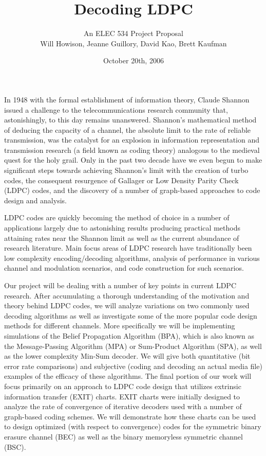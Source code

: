 \documentclass[11pt]{article}
\begin{document}
\title{Decoding LDPC}
\author{An ELEC 534 Project Proposal\\Will Howison, Jeanne Guillory, David Kao, Brett Kaufman }
\date{October 20th, 2006}
\maketitle	%

\thispagestyle{empty}
In 1948 with the formal establishment of information theory, Claude Shannon issued a challenge to the telecommunications research community that, astonishingly, to this day remains unanswered. Shannon's mathematical method of deducing the capacity of a channel, the absolute limit to the rate of reliable transmission, was the catalyst for an explosion in information representation and transmission research (a field known as coding theory) analogous to the medieval quest for the holy grail. Only in the past two decade have we even begun to make significant steps towards achieving Shannon's limit with the creation of turbo codes\cite{BerGlaThi1993}, the consequent resurgence of Gallager or Low Density Parity Check (LDPC) codes\cite{Mackay1999}, and the discovery of a number of graph-based approaches to code design and analysis.

LDPC codes are quickly becoming the method of choice in a number of applications largely due to astonishing results producing practical methods attaining rates near the Shannon limit as well as the current abundance of research literature. Main focus areas of LDPC research have traditionally been low complexity encoding/decoding algorithms, analysis of performance in various channel and modulation scenarios, and code construction for such scenarios.

Our project will be dealing with a number of key points in current LDPC research. After accumulating a thorough understanding of the motivation and theory behind LDPC codes, we will analyze variations on two commonly used decoding algorithms as well as investigate some of the more popular code design methods for different channels. More specifically we will be implementing simulations of the Belief Propagation Algorithm (BPA), which is also known as the Message-Passing Algorithm (MPA) or Sum-Product Algorithm (SPA)\cite{RyanNotes}, as well as the lower complexity Min-Sum decoder. We will give both quantitative (bit error rate comparisons) and subjective (coding and decoding an actual media file) examples of the efficacy of these algorithms. The final portion of our work will focus primarily on an approach to LDPC code design that utilizes extrinsic information transfer (EXIT) charts. EXIT charts were initially designed to analyze the rate of convergence of iterative decoders used with a number of graph-based coding schemes. We will demonstrate how these charts can be used to design optimized (with respect to convergence) codes for the symmetric binary erasure channel (BEC) as well as the binary memoryless symmetric channel (BSC). 
\end{document}

